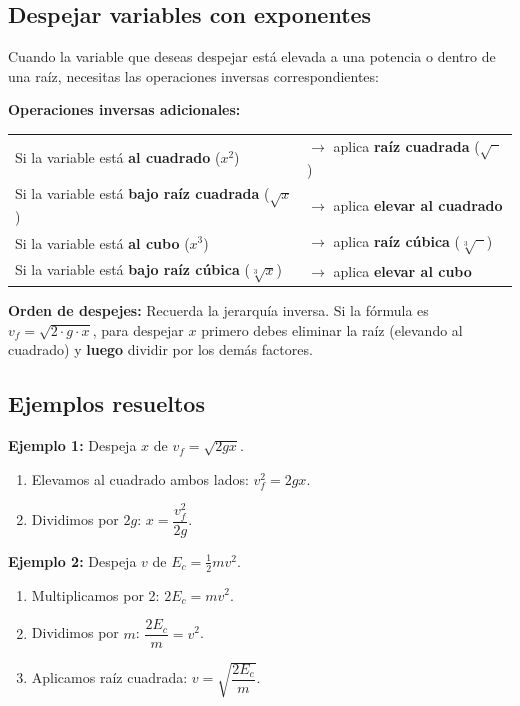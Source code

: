 \documentclass[12pt, a4paper]{article}
\begin{document}
\subsection{Despejar variables con exponentes}

Cuando la variable que deseas despejar está elevada a una potencia o dentro de una raíz, necesitas las operaciones inversas correspondientes:

\begin{cuadroteoria}
\textbf{Operaciones inversas adicionales:}
\begin{center}
\begin{tabular}{ll}
Si la variable está \textbf{al cuadrado} ($x^2$) & $\longrightarrow$ aplica \textbf{raíz cuadrada} ($\sqrt{\phantom{x}}$) \\
Si la variable está \textbf{bajo raíz cuadrada} ($\sqrt{x}$) & $\longrightarrow$ aplica \textbf{elevar al cuadrado} \\
Si la variable está \textbf{al cubo} ($x^3$) & $\longrightarrow$ aplica \textbf{raíz cúbica} ($\sqrt[3]{\phantom{x}}$) \\
Si la variable está \textbf{bajo raíz cúbica} ($\sqrt[3]{x}$) & $\longrightarrow$ aplica \textbf{elevar al cubo}
\end{tabular}
\end{center}
\end{cuadroteoria}

\begin{cuadroadvertencia}
\textbf{Orden de despejes:} Recuerda la jerarquía inversa. Si la fórmula es $v_f = \sqrt{2 \cdot g \cdot x}$, para despejar $x$ primero debes eliminar la raíz (elevando al cuadrado) y \textbf{luego} dividir por los demás factores.
\end{cuadroadvertencia}

\subsection{Ejemplos resueltos}

\noindent\textbf{Ejemplo 1:} Despeja $x$ de $v_f = \sqrt{2gx}$.
\begin{enumerate}
  \item Elevamos al cuadrado ambos lados: $v_f^2 = 2gx$.
  \item Dividimos por $2g$: $x = \dfrac{v_f^2}{2g}$.
\end{enumerate}

\noindent\textbf{Ejemplo 2:} Despeja $v$ de $E_c = \frac{1}{2}mv^2$.
\begin{enumerate}
  \item Multiplicamos por 2: $2E_c = mv^2$.
  \item Dividimos por $m$: $\dfrac{2E_c}{m} = v^2$.
  \item Aplicamos raíz cuadrada: $v = \sqrt{\dfrac{2E_c}{m}}$.
\end{enumerate}
\end{document}
